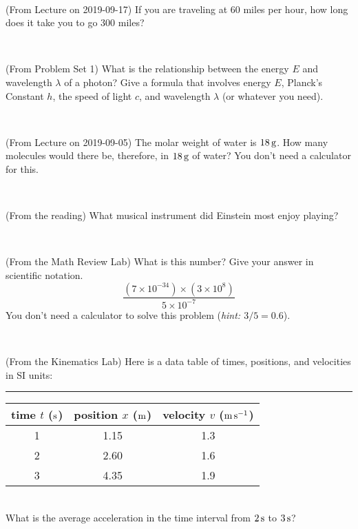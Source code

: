 \documentclass[12pt, letterpaper]{article}
\begin{document}
\vfill ~

\begin{problem} (From Lecture on 2019-09-17)
If you are traveling at 60 miles per hour, how long does
it take you to go 300 miles?
\end{problem}


\vfill ~

\begin{problem} (From Problem Set 1)
What is the relationship between the energy $E$ and wavelength
$\lambda$ of a photon? Give a formula that involves energy $E$,
Planck's Constant $h$, the speed of light $c$, and wavelength
$\lambda$ (or whatever you need).
\end{problem}

\vfill ~

\begin{problem} (From Lecture on 2019-09-05)
The molar weight of water is $18\,\mathrm{g}$. How many molecules would there
be, therefore, in $18\,\mathrm{g}$ of water? You don't need a calculator for
this.
\end{problem}


\vfill ~


\clearpage


\begin{problem} (From the reading)
What musical instrument did Einstein most enjoy playing?
\end{problem}


\vfill ~

\begin{problem} (From the Math Review Lab)
What is this number? Give your answer in scientific notation.
$$
\frac{(7\times10^{-34})\times(3\times10^8)}{5\times10^{-7}}
$$
You don't need a calculator to solve this problem (\textit{hint: $3/5=0.6$}).
\end{problem}


\vfill ~

\begin{problem} (From the Kinematics Lab)
Here is a data table of times, positions, and velocities in SI units:\\
\rule{1.0in}{0pt}\begin{tabular}{c|c|c}
time $t$ ($\mathrm{s}$) & position $x$ ($\mathrm{m}$) & velocity $v$ ($\mathrm{m}\,\mathrm{s}^{-1}$) \\
\hline
1 & 1.15 & 1.3 \\
2 & 2.60 & 1.6 \\
3 & 4.35 & 1.9 \\
\hline
\end{tabular}\\
What is the average acceleration in the time interval from $2\,\mathrm{s}$ to $3\,\mathrm{s}$?
\end{problem}
\end{document}
